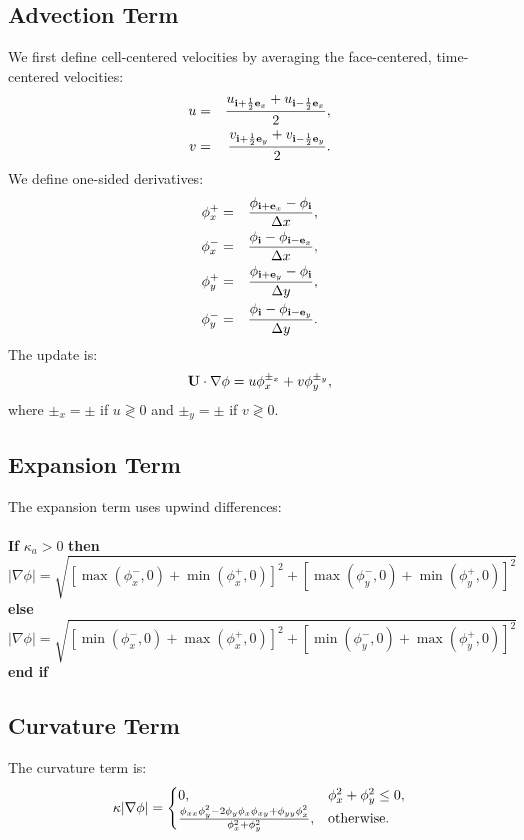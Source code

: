 \subsection{Advection Term}
We first define cell-centered velocities by averaging the face-centered, time-centered velocities:
\begin{eqnarray}
u &=& \frac{u_{{\bf i}+\frac{1}{2}{\bf e}_x} + u_{{\bf i}-\frac{1}{2}{\bf e}_x}}{2}, \\
v &=& \frac{v_{{\bf i}+\frac{1}{2}{\bf e}_y} + v_{{\bf i}-\frac{1}{2}{\bf e}_y}}{2}.
\end{eqnarray}
We define one-sided derivatives:
\begin{eqnarray}
\phi_x^+ &=& \frac{\phi_{{\bf i}+{\bf e}_x}-\phi_{{\bf i}}}{\Delta x}, \\
\phi_x^- &=& \frac{\phi_{{\bf i}}-\phi_{{\bf i}-{\bf e}_x}}{\Delta x}, \\
\phi_y^+ &=& \frac{\phi_{{\bf i}+{\bf e}_y}-\phi_{{\bf i}}}{\Delta y}, \\
\phi_y^- &=& \frac{\phi_{{\bf i}}-\phi_{{\bf i}-{\bf e}_y}}{\Delta y}.
\end{eqnarray}
The update is:
\begin{equation}
{\bf U}\cdot\nabla\phi = u\phi_x^{\pm_x} + v\phi_y^{\pm_y},
\end{equation}
where $\pm_x = \pm$ if $u \gtrless 0$ and $\pm_y = \pm$ if $v \gtrless 0$.
\subsection{Expansion Term}
The expansion term uses upwind differences:\\ \\
{\bf If} $\kappa_a > 0$ {\bf then}
\begin{equation}
|\nabla\phi| = \sqrt{\left[\max(\phi_x^-,0) + \min(\phi_x^+,0)\right]^2 + \left[\max(\phi_y^-,0) + \min(\phi_y^+,0)\right]^2}
\end{equation}
{\bf else}
\begin{equation}
|\nabla\phi| = \sqrt{\left[\min(\phi_x^-,0) + \max(\phi_x^+,0)\right]^2 + \left[\min(\phi_y^-,0) + \max(\phi_y^+,0)\right]^2}
\end{equation}
{\bf end if}
\subsection{Curvature Term}
The curvature term is:
\begin{equation}
\kappa|\nabla\phi| = 
\begin{cases}
0, & \phi_x^2+\phi_y^2 \le 0, \\
\frac{\phi_{xx}\phi_y^2 - 2\phi_y\phi_x\phi_{xy} + \phi_{yy}\phi_x^2}{\phi_x^2 + \phi_y^2}, & {\rm otherwise}. \\
\end{cases}
\end{equation}
